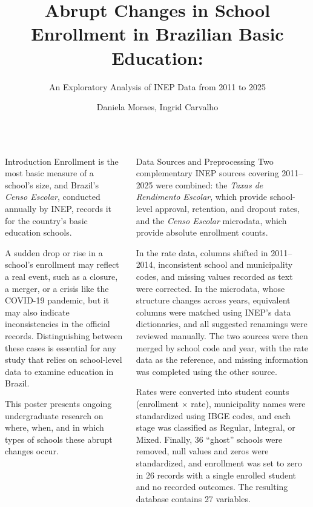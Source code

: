 \documentclass[palette=none,mode=light]{impaTeXPoster}
\title{Abrupt Changes in School Enrollment in Brazilian Basic Education:}
\subtitle{An Exploratory Analysis of INEP Data from 2011 to 2025}
\author{Daniela Moraes, Ingrid Carvalho}
\begin{document}
\maketitle

\begin{columns}


\begin{postercard}{Introduction}
Enrollment is the most basic measure of a school's size, and Brazil's
\textit{Censo Escolar}, conducted annually by INEP, records it for the
country's basic education schools.

A sudden drop or rise in a school's enrollment may reflect a real event,
such as a closure, a merger, or a crisis like the COVID-19 pandemic, but it
may also indicate inconsistencies in the official records. Distinguishing
between these cases is essential for any study that relies on school-level
data to examine education in Brazil.

This poster presents ongoing undergraduate research on where, when, and in
which types of schools these abrupt changes occur.
\end{postercard}

\begin{postercard}{Data Sources and Preprocessing}
Two complementary INEP sources covering 2011--2025 were combined: the
\textit{Taxas de Rendimento Escolar}, which provide school-level approval,
retention, and dropout rates, and the \textit{Censo Escolar} microdata,
which provide absolute enrollment counts.

In the rate data, columns shifted in 2011--2014, inconsistent school and
municipality codes, and missing values recorded as text were corrected. In
the microdata, whose structure changes across years, equivalent columns were
matched using INEP's data dictionaries, and all suggested renamings were
reviewed manually. The two sources were then merged by school code and year,
with the rate data as the reference, and missing information was completed
using the other source.

Rates were converted into student counts (enrollment $\times$ rate),
municipality names were standardized using IBGE codes, and each stage was
classified as Regular, Integral, or Mixed. Finally, 36 ``ghost'' schools
were removed, null values and zeros were standardized, and enrollment was
set to zero in 26 records with a single enrolled student and no recorded
outcomes. The resulting database contains 27 variables.


\end{postercard}
\end{columns}
\end{document}

